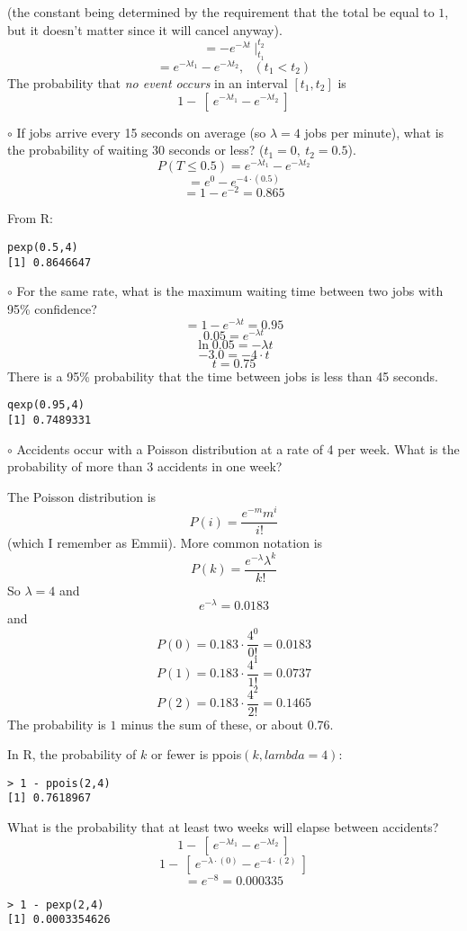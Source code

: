 \documentclass[11pt, oneside]{article}   	%
\begin{document}
(the constant being determined by the requirement that the total be equal to $1$, but it doesn't matter since it will cancel anyway).
\[ = - e^{-\lambda t}  \ \bigg |_{t_1}^{t_2} \]
\[ = e^{-\lambda t_1} - e^{-\lambda t_2}, \ \ \ (t_1 < t_2) \]
The probability that \emph{no event occurs} in an interval $[t_1,t_2]$ is
\[ 1 - \ [ \ e^{-\lambda t_1} - e^{-\lambda t_2} \ ] \]

$\circ$ If jobs arrive every 15 seconds on average (so $\lambda = 4$ jobs per minute), what is the probability of waiting 30 seconds or less?  ($t_1 = 0, \ t_2 = 0.5$).
\[ P(T \le 0.5) = e^{-\lambda t_1} - e^{-\lambda t_2} \]
\[ = e^{0} - e^{-4 \cdot (0.5)} \]
\[ = 1 - e^{-2} = 0.865 \]

From R:
\begin{verbatim}
pexp(0.5,4)
[1] 0.8646647
\end{verbatim}

$\circ$ For the same rate, what is the maximum waiting time between two jobs with 95\% confidence?
\[ = 1 - e^{-\lambda t} = 0.95 \]
\[ 0.05 = e^{-\lambda t} \]
\[ \ln 0.05 = - \lambda t \]
\[ -3.0 = -4 \cdot t \]
\[ t = 0.75 \]
There is a 95\% probability that the time between jobs is less than 45 seconds.
\begin{verbatim}
qexp(0.95,4)
[1] 0.7489331
\end{verbatim}

$\circ$ Accidents occur with a Poisson distribution at a rate of 4 per week.  What is the probability of more than 3 accidents in one week?

The Poisson distribution is
\[ P(i) = \frac{e^{-m} m^i}{i!} \]
(which I remember as Emmii).  More common notation is
\[ P(k) = \frac{e^{-\lambda} \lambda^k}{k!} \]
So $\lambda = 4$ and
\[ e^{- \lambda} = 0.0183 \]
and
\[ P(0) = 0.183 \cdot  \frac{4^0}{0!} = 0.0183  \]
\[ P(1) = 0.183 \cdot  \frac{4^1}{1!} = 0.0737  \]
\[ P(2) = 0.183 \cdot  \frac{4^2}{2!} = 0.1465  \]
The probability is $1$ minus the sum of these, or about $0.76$.

In R, the probability of $k$ or fewer is ppois$(k, lambda=4)$:
\begin{verbatim}
> 1 - ppois(2,4)
[1] 0.7618967
\end{verbatim}

What is the probability that at least two weeks will elapse between accidents?
\[ 1 - \ [ \ e^{-\lambda t_1} - e^{-\lambda t_2} \ ] \]
\[ 1 - \ [ \ e^{-\lambda \cdot(0)} - e^{-4 \cdot (2)} \ ] \]
\[ = e^{-8} = 0.000335 \]

\begin{verbatim}
> 1 - pexp(2,4)
[1] 0.0003354626
\end{verbatim}
\end{document}
